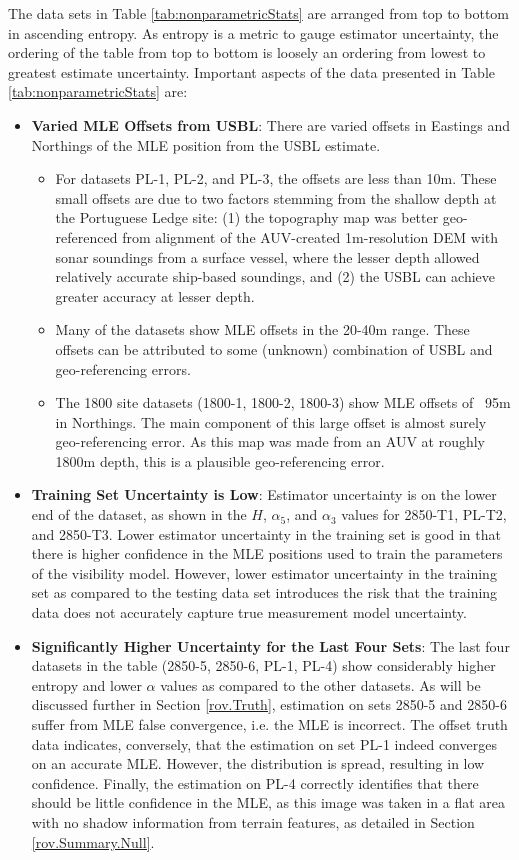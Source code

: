 The data sets in Table \ref{tab:nonparametricStats} are arranged from top to bottom in ascending entropy.
As entropy is a metric to gauge estimator uncertainty, the ordering of the table from top to bottom is loosely an ordering from lowest to greatest estimate uncertainty. 
Important aspects of the data presented in Table \ref{tab:nonparametricStats} are:

\begin{itemize}
\item \textbf{Varied MLE Offsets from USBL}: There are varied offsets in Eastings and Northings of the MLE position from the USBL estimate. 
\begin{itemize}
\item For datasets PL-1, PL-2, and PL-3, the offsets are less than 10m.  These small offsets are due to two factors stemming from the shallow depth at the Portuguese Ledge site: (1) the topography map was better geo-referenced from alignment of the AUV-created 1m-resolution DEM with sonar soundings from a surface vessel, where the lesser depth allowed relatively accurate ship-based soundings, and (2) the USBL can achieve greater accuracy at lesser depth.
\item Many of the datasets show MLE offsets in the 20-40m range.  These offsets can be attributed to some (unknown) combination of USBL and geo-referencing errors.
\item The 1800 site datasets (1800-1, 1800-2, 1800-3) show MLE offsets of ~95m in Northings.  The main component of this large offset is almost surely geo-referencing error.  As this map was made from an AUV at roughly 1800m depth, this is a plausible geo-referencing error.
\end{itemize}
\item \textbf{Training Set Uncertainty is Low}: Estimator uncertainty is on the lower end of the dataset, as shown in the $H$, $\alpha_5$, and $\alpha_3$ values for 2850-T1, PL-T2, and 2850-T3. Lower estimator uncertainty in the training set is good in that there is higher confidence in the MLE positions used to train the parameters of the visibility model.  However, lower estimator uncertainty in the training set as compared to the testing data set introduces the risk that the training data does not accurately capture true measurement model uncertainty.
\item \textbf{Significantly Higher Uncertainty for the Last Four Sets}: The last four datasets in the table (2850-5, 2850-6, PL-1, PL-4) show considerably higher entropy and lower $\alpha$ values as compared to the other datasets.  As will be discussed further in Section \ref{rov.Truth}, estimation on sets 2850-5 and 2850-6 suffer from MLE false convergence, i.e. the MLE is incorrect.  The offset truth data indicates, conversely, that the estimation on set PL-1 indeed converges on an accurate MLE.  However, the distribution is spread, resulting in low confidence.  Finally, the estimation on PL-4 correctly identifies that there should be little confidence in the MLE, as this image was taken in a flat area with no shadow information from terrain features, as detailed in Section \ref{rov.Summary.Null}.
\end{itemize}


